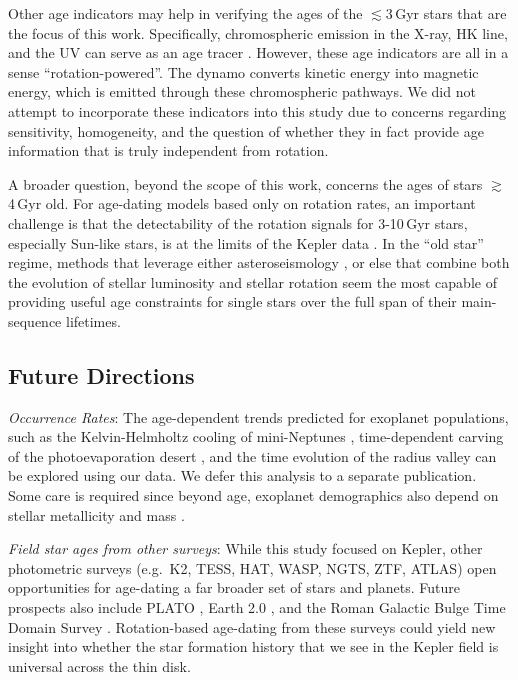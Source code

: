 \documentclass[11pt,twocolumn,tighten,linenumbers,trackchanges]{aastex63}
\begin{document}
Other age indicators may help in verifying the ages of the
$\lesssim$3\,Gyr stars that are the focus of this work.  Specifically,
chromospheric emission in the X-ray,  HK line, and the UV
can serve as an age tracer
\citep{Mamajek_2008,2014MNRAS.441.2361V,2024ApJ...960...62E}.
However, these age indicators are all in a sense ``rotation-powered''.
The dynamo converts kinetic energy into magnetic energy, which is
emitted through these chromospheric pathways.  We did not attempt to
incorporate these indicators into this study due to concerns regarding
sensitivity, homogeneity, and the question of whether they in fact
provide age information that is truly independent from rotation.

A broader question, beyond the scope of this work, concerns the ages
of stars $\gtrsim$4\,Gyr old.  For age-dating models based only on
rotation rates, an important challenge is that the detectability of
the rotation signals for 3-10\,Gyr stars, especially Sun-like stars,
is at the limits of the Kepler data \citep{2022ApJ...937...94M}.  In
the ``old star'' regime, methods that leverage either asteroseismology
\citep{vanSaders_2016,2024ApJ...962..138S}, or else that combine both the
evolution of stellar luminosity and stellar rotation
\citep{Angus_2019,Claytor2020,2023ApJ...952..131M} seem the most capable of
providing useful age constraints for single stars over the full
span of their main-sequence lifetimes.


\subsection{Future Directions}

{\it Occurrence Rates}:
The age-dependent trends predicted for exoplanet populations, such as
the Kelvin-Helmholtz cooling of mini-Neptunes \citep{Gupta_2019},
time-dependent carving of the photoevaporation desert
\citep{Owen2018}, and the time evolution of the radius valley
\citep{Rogers_2021} can be explored using our data.  We defer this
analysis to a separate publication.  Some care is required since
beyond age, exoplanet demographics also depend on stellar metallicity
and mass \citep[e.g.][]{Petigura_2018,Miyazaki2023}.  

{\it Field star ages from other surveys}:
While this study focused on Kepler, other photometric surveys
(e.g.~K2, TESS, HAT, WASP, NGTS, ZTF, ATLAS) open opportunities for
age-dating a far broader set of stars and planets.  Future prospects
also include PLATO \citep{Rauer14}, Earth 2.0
\citep{2022arXiv220606693G}, and the Roman Galactic Bulge Time Domain
Survey \citep{Wilson2023}.  Rotation-based age-dating from these surveys could
yield new insight
into whether the star formation history that we see in the Kepler field is
universal across the thin disk.
\end{document}
